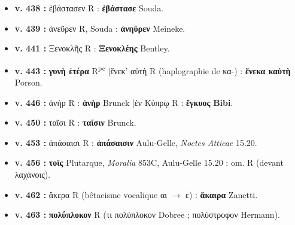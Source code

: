 \documentclass[10pt, a4paper, twoside]{book}
\renewcommand{\_}{\origunderscore\penalty0\relax}
\providecommand{\italique}[1]{\emph{#1}}
\providecommand{\lecon}[1]{\textbf{#1}}
\providecommand{\expo}[1]{\textsuperscript{#1}}
\providecommand{\Rpc}{R\expo{pc}}
\providecommand{\espApp}{\hspace{0.5em}|\hspace{0.5em}}
\begin{document}
\begin{itemize}
\begin{itemize}
    \item \textbf{v. 438 :} ἐβάστασεν R : \lecon{ἐβάστασε} Souda.
    \item \textbf{v. 439 :} ἀνεῦρεν R, Souda : \lecon{ἀνηῦρεν} Meineke.
    \item \textbf{v. 441 :} Ξενοκλῆς R : \lecon{Ξενοκλέης} Bentley.
    \item \textbf{v. 443 :} \lecon{γυνὴ ἑτέρα} \Rpc{} \espApp ἕνεκ' αὐτὴ R (haplographie de κα-) : \lecon{ἕνεκα καὐτὴ} Porson.
    \item \textbf{v. 446 :} ἀνὴρ R : \lecon{ἁνὴρ} Brunck \espApp ἐν Κύπρῳ R : \lecon{ἔγκυος} \lecon{Bibi}.
    \item \textbf{v. 450 :} ταῖσι R : \lecon{ταῖσιν} Brunck.
    \item \textbf{v. 453 :} ἁπάσαισι R : \lecon{ἁπάσαισιν} Aulu-Gelle, \italique{Noctes Atticae} 15.20.
    \item \textbf{v. 456 :} \lecon{τοῖς} Plutarque, \italique{Moralia} 853C, Aulu-Gelle 15.20 : om. R (devant λαχάνοις).
    \item \textbf{v. 462 :} ἄκερα R (bêtacisme vocalique αι $\to$ ε) : \lecon{ἄκαιρα} Zanetti.
    \item \textbf{v. 463 :} \lecon{πολύπλοκον} R (τι πολύπλοκον Dobree ; πολύστροφον Hermann).
  \end{itemize}
\end{itemize}
\end{document}
